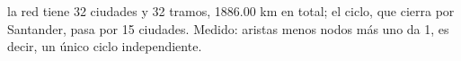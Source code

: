 {la red tiene 32 ciudades y 32 tramos, 1886.00 km en total; el ciclo, que cierra por Santander, pasa por 15 ciudades.}
{Medido: aristas menos nodos más uno da 1, es decir, un único ciclo independiente.}
